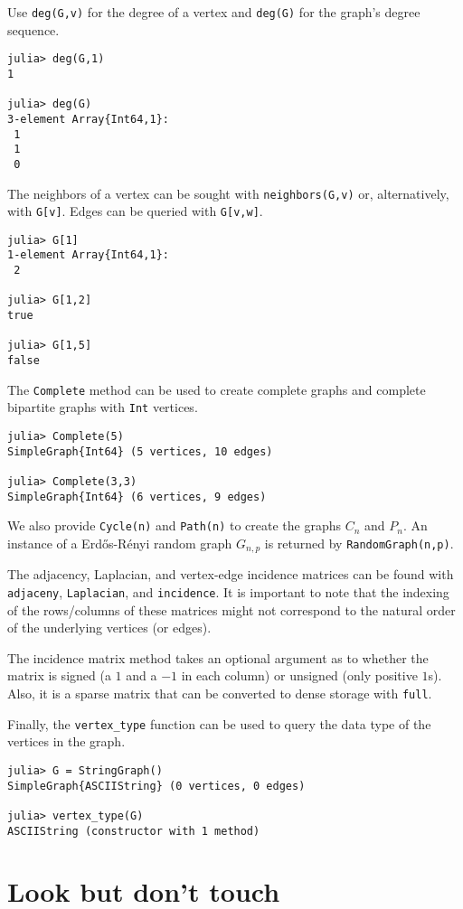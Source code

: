 \documentclass[oneside]{amsart}
\begin{document}
Use \verb|deg(G,v)| for the degree of a vertex and \verb|deg(G)| for
the graph's degree sequence.
\begin{verbatim}
julia> deg(G,1)
1

julia> deg(G)
3-element Array{Int64,1}:
 1
 1
 0
\end{verbatim}

The neighbors of a vertex can be sought with \verb|neighbors(G,v)| or,
alternatively, with \verb|G[v]|. Edges can be queried with
\verb|G[v,w]|.
\begin{verbatim}
julia> G[1]
1-element Array{Int64,1}:
 2

julia> G[1,2]
true

julia> G[1,5]
false
\end{verbatim}

The \verb|Complete| method can be used to create complete graphs
and complete bipartite graphs with \verb|Int| vertices.
\begin{verbatim}
julia> Complete(5)
SimpleGraph{Int64} (5 vertices, 10 edges)

julia> Complete(3,3)
SimpleGraph{Int64} (6 vertices, 9 edges)
\end{verbatim}
We also provide \verb|Cycle(n)| and \verb|Path(n)| to create
the graphs $C_n$ and $P_n$. An instance of a Erd\H{o}s-R\'enyi random
graph $G_{n,p}$ is returned by \verb|RandomGraph(n,p)|.


The adjacency, Laplacian, and vertex-edge incidence matrices can be
found with \verb|adjaceny|, \verb|Laplacian|, and \verb|incidence|. It
is important to note that the indexing of the rows/columns of these
matrices might not correspond to the natural order of the underlying
vertices (or edges).

The incidence matrix method takes an optional argument as to whether
the matrix is signed (a $1$ and a $-1$ in each column) or unsigned
(only positive $1$s). Also, it is a sparse matrix that can be
converted to dense storage with \verb|full|.

Finally, the \verb|vertex_type| function can be used to query the
data type of the vertices in the graph.
\begin{verbatim}
julia> G = StringGraph()
SimpleGraph{ASCIIString} (0 vertices, 0 edges)

julia> vertex_type(G)
ASCIIString (constructor with 1 method)
\end{verbatim}


\section{Look but don't touch}
\label{sect:fastN}
\end{document}
